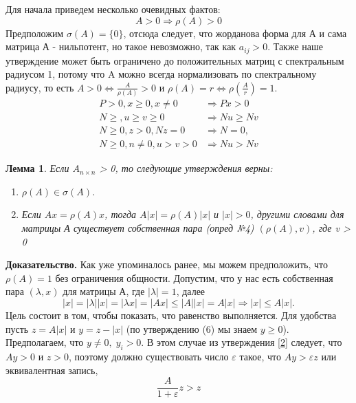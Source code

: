 \documentclass[a4paper,12pt,leqno]{article} %
\newtheorem{lemma}[theorem]{Лемма}
\begin{document}
Для начала приведем несколько очевидных фактов:
\begin{equation}
    A > 0 \Rightarrow \rho(A) > 0
\end{equation}
Предположим $\sigma(A) = \{0\}$, отсюда следует, что
жорданова форма для А и сама матрица А - нильпотент, но такое невозможно, так как $a_{ij} > 0$.
Также наше утверждение может быть ограничено до положительных матриц 
с спектральным радиусом 1, потому что A можно всегда нормализовать 
по спектральному радиусу, то есть $A > 0 \Leftrightarrow \frac{A}{\rho(A)} > 0 \text{ и } \rho(A) = 
r \Leftrightarrow \rho(\frac{A}{r}) = 1.$ 
\begin{align}
    P > 0 , x \geq 0, x \neq 0  &\Rightarrow Px > 0 \label{2} \\
    N \geq, u \geq v \geq 0  &\Rightarrow Nu \geq Nv \\
    N \geq 0, z > 0, Nz = 0  &\Rightarrow N =0, \\
    N \geq 0, n \neq 0, u > v > 0  &\Rightarrow Nu > Nv \label{5}
\end{align}
\begin{lemma}
    Если $A_{n \times n}$ > 0, то следующие утверждения верны:
    \begin{enumerate}
        \item $\rho(A) \in \sigma(A)$.
        \item Если $Ax=\rho(A)x$, тогда $A|x| = \rho(A)|x| $ и $|x| > 0$,
        другими словами для матрицы А существует собственная пара (опред №4)
        $(\rho(A), v)$, где v > 0
    \end{enumerate}
\end{lemma}
\noindent \textbf{Доказательство.} 
Как уже упоминалось ранее, мы можем предположить, 
что $\rho(A) = 1$ без ограничения общности.  Допустим, что у нас есть 
собственная пара $(\lambda, x)$ для матрицы А, где $|\lambda| = 1$, далее 
\begin{equation}
    |x| = |\lambda||x| = |\lambda x|= |Ax| \leq |A||x| = A|x| \Rightarrow |x| \leq A|x|.
\end{equation}
Цель состоит в том, чтобы показать, что равенство выполняется. Для удобства
пусть $z = A|x|$ и $y = z - |x|$ (по утверждению (6) мы знаем $y \geq 0$).
Предполагаем, что $y \neq 0, \; y_{i} > 0$. В этом случае из утверждения \eqref{2}
следует, что $Ay > 0$ и $z > 0$, поэтому должно существовать число $\varepsilon$
такое, что $Ay > \varepsilon z$ или эквивалентная запись, 
\begin{equation*}
    \frac{A}{1 + \varepsilon}z > z
\end{equation*}
\end{document}

